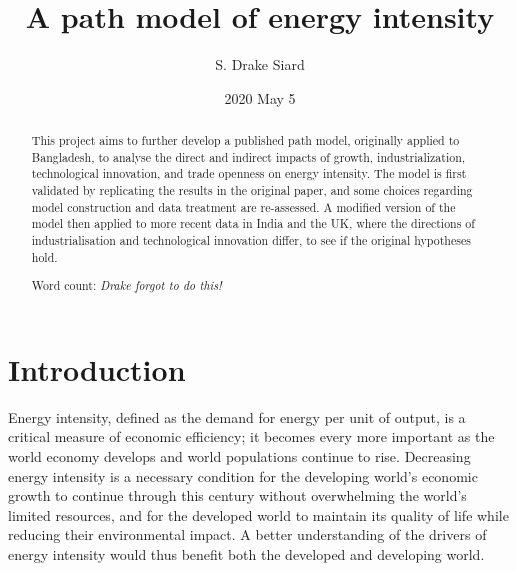 \documentclass[11pt,a4paper]{article}
\title{\textbf{A path model of energy intensity}}
\author{S. Drake Siard}
\date{2020 May 5}
\begin{document}
\maketitle

\begin{abstract}
This project aims to further develop a published path model, originally applied to Bangladesh, to analyse the direct and indirect impacts of growth, industrialization, technological innovation, and trade openness on energy intensity.
The model is first validated by replicating the results in the original paper, and some choices regarding model construction and data treatment are re-assessed.
A modified version of the model then applied to more recent data in India and the UK, where the directions of industrialisation and technological innovation differ, to see if the original hypotheses hold.

Word count: \em{Drake forgot to do this!}
 
\end{abstract}

\tableofcontents

\pagebreak

\section{Introduction}\label{sec:introduction}

Energy intensity, defined as the demand for energy per unit of output, is a critical measure of economic efficiency; it becomes every more important as the world economy develops and world populations continue to rise.
Decreasing energy intensity is a necessary condition for the developing world's economic growth to continue through this century without overwhelming the world's limited resources, and for the developed world to maintain its quality of life while reducing their environmental impact.
A better understanding of the drivers of energy intensity would thus benefit both the developed and developing world.
\end{document}
